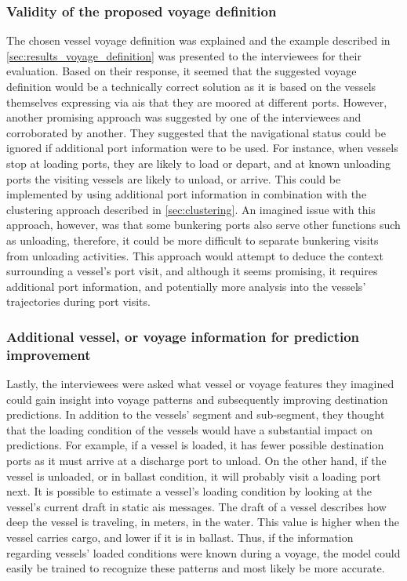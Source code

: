 \subsubsection{Validity of the proposed voyage definition}

The chosen vessel voyage definition was explained and the example described in \cref{sec:results_voyage_definition} was presented to the interviewees for their evaluation. Based on their response, it seemed that the suggested voyage definition would be a technically correct solution as it is based on the vessels themselves expressing via \acrshort{ais} that they are moored at different ports. However, another promising approach was suggested by one of the interviewees and corroborated by another. They suggested that the navigational status could be ignored if additional port information were to be used. For instance, when vessels stop at loading ports, they are likely to load or depart, and at known unloading ports the visiting vessels are likely to unload, or arrive. This could be implemented by using additional port information in combination with the clustering approach described in \cref{sec:clustering}. An imagined issue with this approach, however, was that some bunkering ports also serve other functions such as unloading, therefore, it could be more difficult to separate bunkering visits from unloading activities. This approach would attempt to deduce the context surrounding a vessel's port visit, and although it seems promising, it requires additional port information, and potentially more analysis into the vessels' trajectories during port visits.

\subsubsection{Additional vessel, or voyage information for prediction improvement}

Lastly, the interviewees were asked what vessel or voyage features they imagined could gain insight into voyage patterns and subsequently improving destination predictions. In addition to the vessels' segment and sub-segment, they thought that the loading condition of the vessels would have a substantial impact on predictions. For example, if a vessel is loaded, it has fewer possible destination ports as it must arrive at a discharge port to unload. On the other hand, if the vessel is unloaded, or in ballast condition, it will probably visit a loading port next. It is possible to estimate a vessel's loading condition by looking at the vessel's current draft in static \acrshort{ais} messages. The draft of a vessel describes how deep the vessel is traveling, in meters, in the water. This value is higher when the vessel carries cargo, and lower if it is in ballast. Thus, if the information regarding vessels' loaded conditions were known during a voyage, the model could easily be trained to recognize these patterns and most likely be more accurate.

